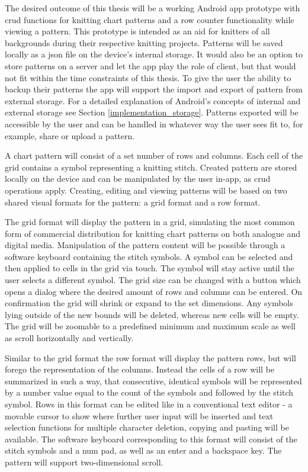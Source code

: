 The desired outcome of this thesis will be a working Android app prototype with \gls{crud} functions for knitting chart patterns and a row counter functionality while viewing a pattern. This prototype is intended as an aid for knitters of all backgrounds during their respective knitting projects. Patterns will be saved locally as a \gls{json} file on the device's internal storage. It would also be an option to store patterns on a server and let the app play the role of client, but that would not fit within the time constraints of this thesis. To give the user the ability to backup their patterns the app will support the import and export of pattern from external storage. For a detailed explanation of Android's concepts of internal and external storage see Section \ref{implementation_storage}. Patterns exported will be accessible by the user and can be handled in whatever way the user sees fit to, for example, share or upload a pattern.

A chart pattern will consist of a set number of rows and columns. Each cell of the grid contains a symbol representing a knitting stitch. Created pattern are stored locally on the device and can be manipulated by the user in-app, as \gls{crud} operations apply. Creating, editing and viewing patterns will be based on two shared visual formats for the pattern: a grid format and a row format.

The grid format will display the pattern in a grid, simulating the most common form of commercial distribution for knitting chart patterns on both analogue and digital media. Manipulation of the pattern content will be possible through a software keyboard containing the stitch symbols. A symbol can be selected and then applied to cells in the grid via touch. The symbol will stay active until the user selects a different symbol. The grid size can be changed with a button which opens a dialog where the desired amount of rows and columns can be entered. On confirmation the grid will shrink or expand to the set dimensions. Any symbols lying outside of the new bounds will be deleted, whereas new cells will be empty. The grid will be zoomable to a predefined minimum and maximum scale as well as scroll horizontally and vertically.

Similar to the grid format the row format will display the pattern rows, but will forego the representation of the columns. Instead the cells of a row will be summarized in such a way, that consecutive, identical symbols will be represented  by a number value equal to the count of the symbols and followed by the stitch symbol. Rows in this format can be edited like in  a conventional text editor - a movable cursor to show where further user input will be inserted and text selection functions for multiple character deletion, copying and pasting will be available. The software keyboard corresponding to this format will consist of the stitch symbols and a num pad, as well as an enter and a backspace key. The pattern will support two-dimensional scroll.

